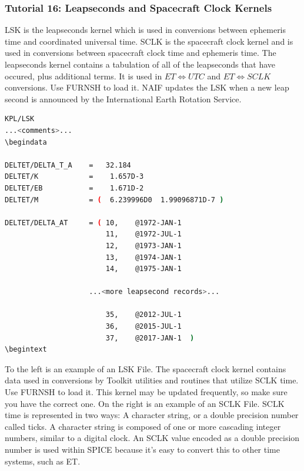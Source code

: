 \documentclass[crop=false,class=book]{standalone}
\begin{document}
\subsubsection{Tutorial 16: Leapseconds and Spacecraft Clock Kernels}
LSK is the leapseconds kernel which is used in conversions between ephemeris time and coordinated universal time. SCLK is the spacecraft clock kernel and is used in conversions between spacecraft clock time and ephemeris time. The leapseconds kernel contains a tabulation of all of the leapseconds that have occured, plus additional terms. It is used in $ET\Leftrightarrow UTC$ and $ET\Leftrightarrow SCLK$ conversions. Use FURNSH to load it. NAIF updates the LSK when a new leap second is announced by the International Earth Rotation Service.
\begin{lstlisting}[language=bash,basicstyle=\footnotesize]
KPL/LSK
...<comments>...
\begindata

DELTET/DELTA_T_A    =   32.184
DELTET/K            =    1.657D-3
DELTET/EB           =    1.671D-2
DELTET/M            = (  6.239996D0  1.99096871D-7 )

DELTET/DELTA_AT     = ( 10,    @1972-JAN-1
                        11,    @1972-JUL-1
                        12,    @1973-JAN-1
                        13,    @1974-JAN-1
                        14,    @1975-JAN-1

                    ...<more leapsecond records>...

                        35,    @2012-JUL-1
                        36,    @2015-JUL-1
                        37,    @2017-JAN-1  )
\begintext
\end{lstlisting}
To the left is an example of an LSK File. The spacecraft clock kernel contains data used in conversions by Toolkit utilities and routines that utilize SCLK time. Use FURNSH to load it. This kernel may be updated frequently, so make sure you have the correct one. On the right is an example of an SCLK File. SCLK time is represented in two ways: A character string, or a double precision number called ticks. A character string is composed of one or more cascading integer numbers, similar to a digital clock. An SCLK value encoded as a double precision number is used within SPICE because it's easy to convert this to other time systems, such as ET.
\end{document}
